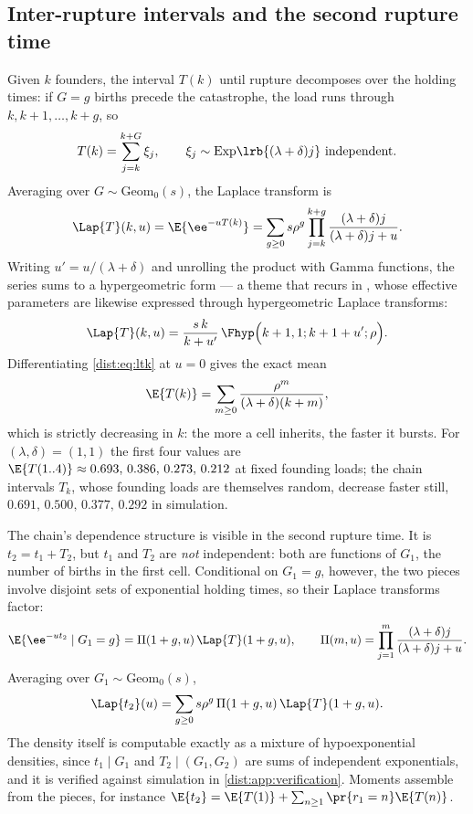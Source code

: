 \subsection{Inter-rupture intervals and the second rupture time}
\label{dist:app:chained-transforms}

Given $k$ founders, the interval $T(k)$ until rupture decomposes over the
holding times: if $G=g$ births precede the catastrophe, the load runs through
$k,k+1,\ldots,k+g$, so
\begin{equation}
T(k)=\sum_{j=k}^{k+G}\xi_j,
\qquad
\xi_j\sim\mathrm{Exp}\lrb{(\lambda+\delta)j}\ \text{independent}.
\label{dist:eq:tkdecomp}
\end{equation}
Averaging over $G\sim\mathrm{Geom}_0(s)$, the Laplace transform is
\begin{equation}
\Lap{T}(k,u)=\E{\ee^{-uT(k)}}
=\sum_{g\ge0}s\rho^g\prod_{j=k}^{k+g}\frac{(\lambda+\delta)j}
{(\lambda+\delta)j+u}.
\label{dist:eq:ltk}
\end{equation}
Writing $u'=u/(\lambda+\delta)$ and unrolling the product with Gamma
functions, the series sums to a hypergeometric form --- a theme that recurs in
\ChPop, whose effective parameters are likewise expressed through
hypergeometric Laplace transforms:
\begin{equation}
\Lap{T}(k,u)=\frac{s\,k}{k+u'}\,\Fhyp\Bigl(k+1,1;k+1+u';\rho\Bigr).
\label{dist:eq:ltkhyp}
\end{equation}
Differentiating \cref{dist:eq:ltk} at $u=0$ gives the exact mean
\begin{equation}
\E{T(k)}=\sum_{m\ge0}\frac{\rho^m}{(\lambda+\delta)(k+m)},
\label{dist:eq:meant}
\end{equation}
which is strictly decreasing in $k$: the more a cell inherits, the faster it
bursts. For $(\lambda,\delta)=(1,1)$ the first four values are
$\E{T(1..4)}\approx0.693,\,0.386,\,0.273,\,0.212$ at fixed founding loads;
the chain intervals $T_k$, whose founding loads are themselves random,
decrease faster still, $0.691,\,0.500,\,0.377,\,0.292$ in simulation.

The chain's dependence structure is visible in the second rupture time. It is
$t_2=t_1+T_2$, but $t_1$ and $T_2$ are \emph{not} independent: both are
functions of $G_1$, the number of births in the first cell. Conditional on
$G_1=g$, however, the two pieces involve disjoint sets of exponential holding
times, so their Laplace transforms factor:
\begin{equation}
\E{\ee^{-ut_2}\mid G_1=g}
=\Pi(1+g,u)\,\Lap{T}(1+g,u),
\qquad
\Pi(m,u)=\prod_{j=1}^{m}\frac{(\lambda+\delta)j}{(\lambda+\delta)j+u}.
\label{dist:eq:t2cond}
\end{equation}
Averaging over $G_1\sim\mathrm{Geom}_0(s)$,
\begin{equation}
\Lap{t_2}(u)
=\sum_{g\ge0} s\rho^g\,\Pi(1+g,u)\,\Lap{T}(1+g,u).
\label{dist:eq:lt2}
\end{equation}
The density itself is computable exactly as a mixture of hypoexponential
densities, since $t_1\mid G_1$ and $T_2\mid(G_1,G_2)$ are sums of independent
exponentials, and it is verified against simulation in
\cref{dist:app:verification}. Moments assemble from the pieces, for instance
$\E{t_2}=\E{T(1)}+\sum_{n\ge1}\pr{r_1=n}\E{T(n)}$.
